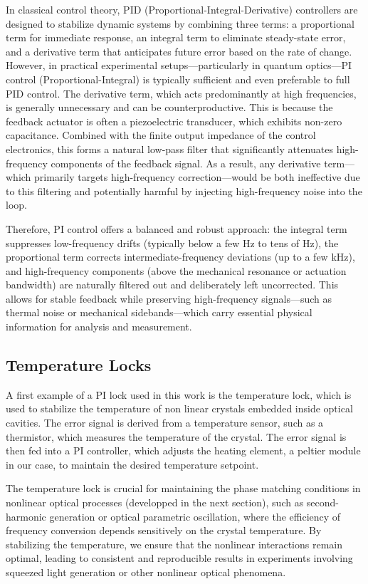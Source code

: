 \noindent In classical control theory, PID (Proportional-Integral-Derivative) controllers are designed to stabilize dynamic systems by combining three terms: a proportional term for immediate response, an integral term to eliminate steady-state error, and a derivative term that anticipates future error based on the rate of change. However, in practical experimental setups—particularly in quantum optics—PI control (Proportional-Integral) is typically sufficient and even preferable to full PID control. The derivative term, which acts predominantly at high frequencies, is generally unnecessary and can be counterproductive. This is because the feedback actuator is often a piezoelectric transducer, which exhibits non-zero capacitance. Combined with the finite output impedance of the control electronics, this forms a natural low-pass filter that significantly attenuates high-frequency components of the feedback signal. As a result, any derivative term—which primarily targets high-frequency correction—would be both ineffective due to this filtering and potentially harmful by injecting high-frequency noise into the loop. \newline 

\noindent Therefore, PI control offers a balanced and robust approach: the integral term suppresses low-frequency drifts (typically below a few Hz to tens of Hz), the proportional term corrects intermediate-frequency deviations (up to a few kHz), and high-frequency components (above the mechanical resonance or actuation bandwidth) are naturally filtered out and deliberately left uncorrected. This allows for stable feedback while preserving high-frequency signals—such as thermal noise or mechanical sidebands—which carry essential physical information for analysis and measurement.

\subsection{Temperature Locks}
A first example of a PI lock used in this work is the temperature lock, which is used to stabilize the temperature of non linear crystals embedded inside optical cavities. The error signal is derived from a temperature sensor, such as a thermistor, which measures the temperature of the crystal. The error signal is then fed into a PI controller, which adjusts the heating element, a peltier module in our case, to maintain the desired temperature setpoint. \newline

\noindent The temperature lock is crucial for maintaining the phase matching conditions in nonlinear optical processes (developped in the next section), such as second-harmonic generation or optical parametric oscillation, where the efficiency of frequency conversion depends sensitively on the crystal temperature. By stabilizing the temperature, we ensure that the nonlinear interactions remain optimal, leading to consistent and reproducible results in experiments involving squeezed light generation or other nonlinear optical phenomena. \newline



